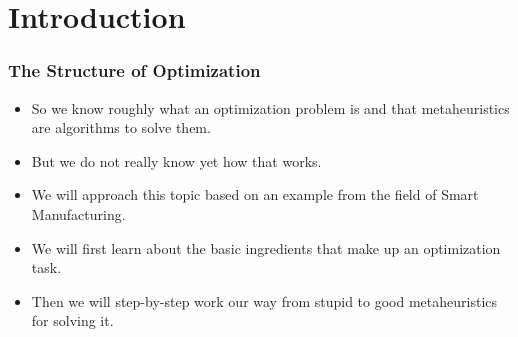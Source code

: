 \documentclass[mathserif]{beamer}%
\subtitle{2. Structure}%
\begin{document}
%
%
\startPresentation{}%
%
%
\section{Introduction}%
%
\begin{frame}%
\frametitle{The Structure of Optimization}%
\begin{itemize}%
\item So we know roughly what an optimization problem is and that metaheuristics\cite{aitoa,WGOEB,GK2003HOM,MF2004HTSIMH} are algorithms to solve them.%
\item<2-> But we do not really know yet how that works.%
\item<3-> We will approach this topic based on an example from the field of Smart Manufacturing.
\item<4-> We will first learn about the basic ingredients that make up an optimization task.%
\item<5-> Then we will step-by-step work our way from stupid to good metaheuristics for solving it.%
\end{itemize}%
\end{frame}%
%
%
\end{document}
